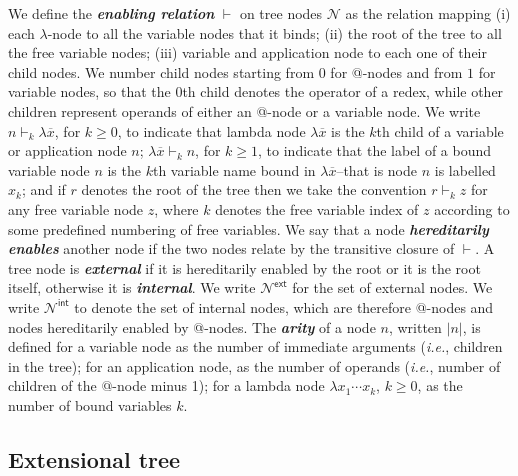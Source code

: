 \documentclass[xchauthor,chkrefs,GCNS,amsmath,amsthm,rotating,leaveRGB]{tcsg}
\renewcommand{\index}[1]{}
\theoremstyle{plain}
\theoremstyle{definition}
\newcommand{\Nodes}{\mathcal{N}}
\newcommand{\enables}{\vdash}
\newcommand{\ExternalNodes}{\Nodes^{\mathsf{ext}}}
\newcommand{\InternalNodes}{\Nodes^{\mathsf{int}}}
\begin{document}
We define the \textbf{\emph{enabling relation}}\index{enabling relation}
$\enables $ on tree nodes $\Nodes $ as the relation mapping (i) each $\lambda
$-node to all the variable nodes that it binds; (ii) the root of the tree to
all the free variable nodes; (iii) variable and application node to each one
of their child nodes. We number child nodes starting from $0$ for @-nodes and
from $1$ for variable nodes, so that the $0$th child denotes the operator of
a redex, while other children represent operands of either an @-node or a
variable node. We write $n \enables _{k} \lambda \overline{x}$, for $k\geq
0$, to indicate that lambda node $\lambda \overline{x}$ is the $k$th child of
a variable or application node $n$; $\lambda \overline{x} \enables _{k} n$,
for $k\geq 1$, to indicate that the label of a bound variable node $n$ is the
$k$th variable name bound in $\lambda \overline{x}$--that is node $n$ is
labelled $x_{k}$; and if $r$ denotes the root of the tree then we take the
convention $r \enables _{k} z$ for any free variable node $z$, where $k$
denotes the free variable index of $z$ according to some predefined numbering
of free variables. We say that a node \textbf{\emph{hereditarily
enables}}\index{hereditarily enables} another node if the two nodes relate by
the transitive closure of $\enables $. A tree node is
\textbf{\emph{external}}\index{external} if it is hereditarily enabled by the
root or it is the root itself, otherwise it is
\textbf{\emph{internal}}\index{internal}. We write $\ExternalNodes $ for the
set of external nodes. We write $\InternalNodes $ to denote the set of
internal nodes, which are therefore @-nodes and nodes hereditarily enabled by
@-nodes. The \textbf{\emph{arity}}\index{arity} of a node $n$, written $|n|$,
is defined for a variable node as the number of immediate arguments
(\textit{i.e.}, children in the tree); for an application node, as the number
of operands (\textit{i.e.}, number of children of the $@$-node minus 1); for
a lambda node $\lambda x_{1} \cdots x_{k}$, $k\geq 0$, as the number of bound
variables $k$.

\subsection{Extensional tree}\label{sec2.4}
\end{document}
